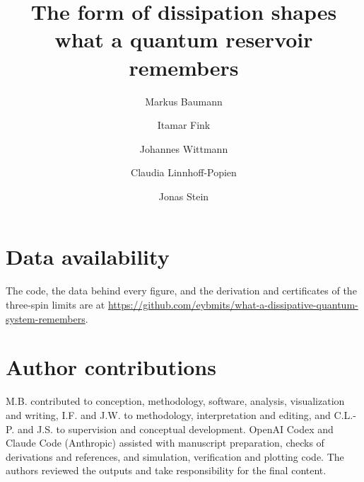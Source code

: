 \documentclass[a4paper,twocolumn,11pt,unpublished]{quantumarticle}
\theoremstyle{keyresult}
\begin{document}
\title{The form of dissipation shapes what a quantum reservoir remembers}

\author[qar,mobile]{Markus Baumann}
\author[mobile]{Itamar Fink}
\author[mobile]{Johannes Wittmann}
\author[qar,mobile]{Claudia Linnhoff-Popien}
\author[qar,mobile]{Jonas Stein}


\maketitle
\raggedbottom
\makeatletter{}\makeatother






\section*{Data availability}
The code, the data behind every figure, and the derivation and certificates of the three-spin limits are at
\url{https://github.com/eybmits/what-a-dissipative-quantum-system-remembers}.

\section*{Author contributions}
M.B. contributed to conception, methodology, software, analysis, visualization and writing, I.F. and J.W. to
methodology, interpretation and editing, and C.L.-P. and J.S. to supervision and conceptual development. OpenAI Codex
and Claude Code (Anthropic) assisted with manuscript preparation, checks of derivations and references, and simulation,
verification and plotting code. The authors reviewed the outputs and take responsibility for the final content.
\end{document}
